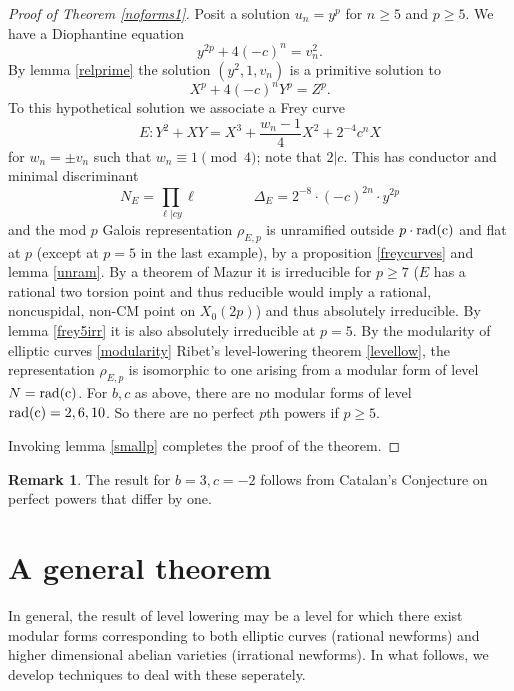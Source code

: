 \documentclass[12pt]{amsart}
\theoremstyle{definition}
\newtheorem{rem}[thm]{Remark}
\newcommand{\rad}{\rm rad}
\begin{document}
\begin{proof}[Proof of Theorem \ref{noforms1}]
Posit a solution $u_n = y^p$ for $n \geq 5$ and $p \geq 5$.  We have a Diophantine equation
\[ y^{2p} + 4(-c)^n = v_n^2. \] 
By lemma \ref{relprime} the solution $(y^2, 1, v_n)$ is a primitive solution to 
\[ X^p + 4(-c)^n Y^p = Z^p.\]
To this hypothetical solution we associate a Frey curve
\[E: Y^2 + XY = X^3 + \frac{w_n - 1}{4} X^2 + 2^{-4}c^nX \]
for $w_n = \pm v_n$ such that $w_n \equiv 1 \pmod{4}$; note that $2|c$.  This has conductor and minimal discriminant
\begin{equation}\label{conddis1} N_E =\prod_{\ell | cy} \ell  \qquad \qquad \Delta_E = 2^{-8} \cdot (-c)^{2n} \cdot y^{2p} \end{equation}
and the mod $p$ Galois representation $\rho_{E,p}$ is unramified outside $p\cdot \rad{(c)}$ and flat at $p$ (except at $p=5$ in the last example), by a proposition \ref{freycurves} and lemma \ref{unram}.   By a theorem of Mazur it is irreducible for $p \geq 7$ ($E$ has a rational two torsion point and thus reducible would imply a rational, noncuspidal, non-CM point on $X_0(2p)$) and thus absolutely irreducible.  By lemma \ref{frey5irr} it is also absolutely irreducible at $p=5$.  By the modularity of elliptic curves \ref{modularity} Ribet's level-lowering theorem \ref{levellow}, the representation $\rho_{E,p}$ is isomorphic to one arising from a modular form of level $N = \rad(c)$.  For $b,c$ as above, there are no modular forms of level $\rad(c)=2,6,10$.  So there are no perfect $p$th powers if $p \geq 5$.

Invoking lemma \ref{smallp} completes the proof of the theorem.
\end{proof}

\begin{rem}
The result for $b = 3, c = -2$ follows from Catalan's Conjecture on perfect powers that differ by one.
\end{rem}



\section{A general theorem}

In general, the result of level lowering may be a level for which there exist modular forms corresponding to both elliptic curves (rational newforms) and higher dimensional abelian varieties (irrational newforms).  In what follows, we develop techniques to deal with these seperately.
\end{document}
